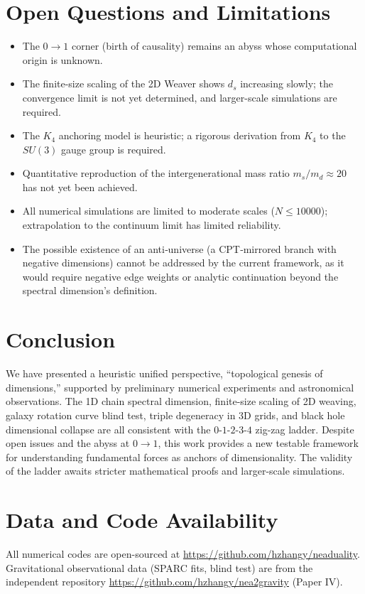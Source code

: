 \documentclass[12pt,a4paper]{article}
\begin{document}
\section{Open Questions and Limitations}
\begin{itemize}
    \item The $0\to1$ corner (birth of causality) remains an abyss whose computational origin is unknown.
    \item The finite-size scaling of the 2D Weaver shows $d_s$ increasing slowly; the convergence limit is not yet determined, and larger-scale simulations are required.
    \item The $K_4$ anchoring model is heuristic; a rigorous derivation from $K_4$ to the $SU(3)$ gauge group is required.
    \item Quantitative reproduction of the intergenerational mass ratio $m_s/m_d\approx20$ has not yet been achieved.
    \item All numerical simulations are limited to moderate scales ($N\leq10000$); extrapolation to the continuum limit has limited reliability.
    \item The possible existence of an anti‑universe (a CPT‑mirrored branch with negative dimensions) cannot be addressed by the current framework, as it would require negative edge weights or analytic continuation beyond the spectral dimension’s definition.
\end{itemize}

\section{Conclusion}
We have presented a heuristic unified perspective, ``topological genesis of dimensions,'' supported by preliminary numerical experiments and astronomical observations. The 1D chain spectral dimension, finite-size scaling of 2D weaving, galaxy rotation curve blind test, triple degeneracy in 3D grids, and black hole dimensional collapse are all consistent with the $0$-$1$-$2$-$3$-$4$ zig-zag ladder. Despite open issues and the abyss at $0\to1$, this work provides a new testable framework for understanding fundamental forces as anchors of dimensionality. The validity of the ladder awaits stricter mathematical proofs and larger-scale simulations.

\section*{Data and Code Availability}
All numerical codes are open-sourced at \url{https://github.com/hzhangy/neaduality}. Gravitational observational data (SPARC fits, blind test) are from the independent repository \url{https://github.com/hzhangy/nea2gravity} (Paper IV).
\end{document}
